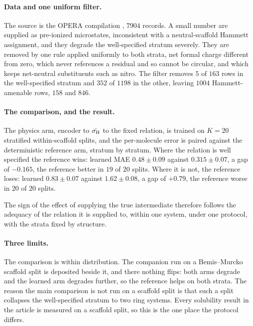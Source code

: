 \paragraph{Data and one uniform filter.}
The source is the OPERA compilation \cite{mansouri2019opera}, $7904$ records. A small number are
supplied as pre-ionized microstates, inconsistent with a neutral-scaffold Hammett assignment, and
they degrade the well-specified stratum severely. They are removed by one rule applied uniformly to
both strata, net formal charge different from zero, which never references a residual and so cannot
be circular, and which keeps net-neutral substituents such as nitro. The filter removes $5$ of
$163$ rows in the well-specified stratum and $352$ of $1198$ in the other, leaving $1004$
Hammett-amenable rows, $158$ and $846$.

\paragraph{The comparison, and the result.}
The physics arm, encoder to $\hat{\sigma_{\mathrm H}}$ to the fixed relation, is trained on $K=20$ stratified
within-scaffold splits, and the per-molecule error is paired against the deterministic reference
arm, stratum by stratum. Where the relation is well specified the reference wins: learned MAE
$0.48\pm0.09$ against $0.315\pm0.07$, a gap of $-0.165$, the reference better in $19$ of $20$
splits. Where it is not, the reference loses: learned $0.83\pm0.07$ against $1.62\pm0.08$, a gap of
$+0.79$, the reference worse in $20$ of $20$ splits.

The sign of the effect of supplying the true intermediate therefore follows the adequacy of the
relation it is supplied to, within one system, under one protocol, with the strata fixed by
structure.

\paragraph{Three limits.}
The comparison is within distribution. The companion run on a Bemis--Murcko scaffold split is
deposited beside it, and there nothing flips: both arms degrade and the learned arm degrades
further, so the reference helps on both strata. The reason the main comparison is not run on a
scaffold split is that such a split collapses the well-specified stratum to two ring systems. Every
solubility result in the article is measured on a scaffold split, so this is the one place the
protocol differs.

